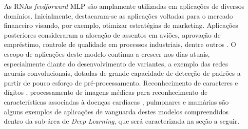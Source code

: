 As RNAs \emph{feedforward} MLP são amplamente utilizadas em aplicações de diversos domínios. Inicialmente, destacaram-se as aplicações voltadas para o mercado financeiro visando, por exemplo, otimizar estratégias de marketing. Aplicações posteriores consideraram a alocação de assentos em aviões, aprovação de empréstimo, controle de qualidade em processos industriais, dentre outros \cite{widrow1994neural}. O escopo de aplicações deste modelo continua a crescer nos dias atuais, especialmente diante do desenvolvimento de variantes, a exemplo das redes neurais convolucionais, dotadas de grande capacidade de detecção de padrões a partir de pouco esforço de pré-processamento. Reconhecimento de caracteres e dígitos  \cite{lenet}, processamento de imagens médicas para reconhecimento de características associadas à doenças cardíacas \cite{oktay2018anatomically}, pulmonares \cite{mingchen2018holistic} e mamárias \cite{dubrovina2018mammography} são alguns exemplos de aplicações de vanguarda destes modelos compreendidos dentro da sub-área de \emph{Deep Learning}, que será caracterizada na seção a seguir.

